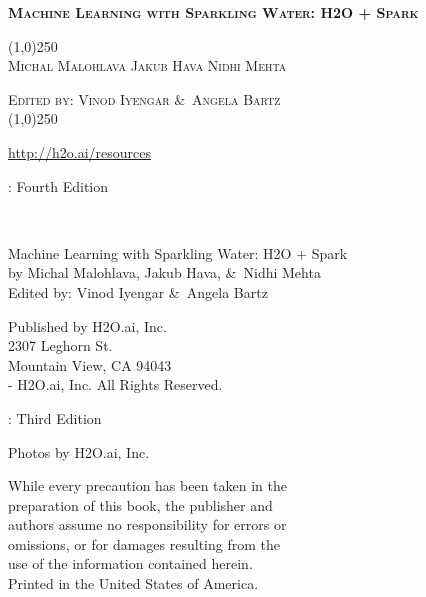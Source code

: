 

%
%
\usepackage{tabularx}
\usepackage{booktabs}
\usepackage{forest}
\usepackage{url}
\usepackage{longtable}
\def\UrlBreaks{\do\/\do-\do_\do.}



\thispagestyle{empty} %

\begin{center}
\textsc{\large\bf{Machine Learning with Sparkling Water: H2O + Spark}}

\bigskip
\line(1,0){250}  %
\\
\bigskip
\textsc{\small{Michal Malohlava\hspace{20pt} Jakub Hava\hspace{20pt} Nidhi Mehta}}

\textsc{\small{Edited by: Vinod Iyengar \&\ Angela Bartz}}
\\
\bigskip
\line(1,0){250}  %


{\url{http://h2o.ai/resources}}

\bigskip
\monthname \hspace{1pt}  \the\year: Fourth Edition
\\%
\bigskip
\end{center}

\newpage
\null\vfill %

\thispagestyle{empty}%


{\raggedright\vfill\ 

Machine Learning with Sparkling Water: H2O + Spark\\
  by Michal Malohlava, Jakub Hava, \&\ Nidhi Mehta\\
  Edited by: Vinod Iyengar \&\ Angela Bartz
  
\bigskip
  Published by H2O.ai, Inc. \\
2307 Leghorn St. \\
Mountain View, CA 94043\\
\bigskip
{}-\the\year \hspace{1pt} H2O.ai, Inc. All Rights Reserved. 
\bigskip

\monthname \hspace{1pt}  \the\year: Third Edition
\bigskip

Photos by \textcopyright H2O.ai, Inc. 
\bigskip

While every precaution has been taken in the\\
preparation of this book, the publisher and\\
authors assume no responsibility for errors or\\
omissions, or for damages resulting from the\\
use of the information contained herein.\\
\bigskip
Printed in the United States of America. 


}\par

